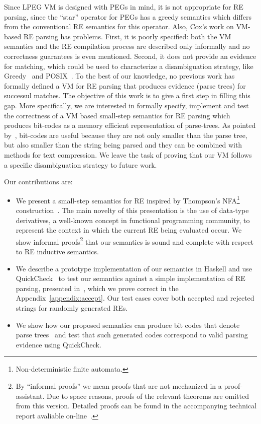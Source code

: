 \documentclass[sigplan]{acmart}
\theoremstyle{definition}
\begin{document}
Since LPEG VM is designed with PEGs in mind, it is not appropriate for RE parsing, since the ``star''
operator for PEGs has a greedy semantics which differs from the conventional RE semantics for this operator. Also, Cox's work
on VM-based RE parsing has problems. First, it is poorly specified: both the VM semantics and the RE
compilation process are described only informally and no correctness guarantees is even mentioned. Second,
it does not provide an evidence for matching, which could be used to characterize a disambiguation strategy, like
Greedy~\cite{Frisch2004} and POSIX~\cite{Sulzmann14}. To the best of our knowledge, no previous work
has formally defined a VM for RE parsing that produces evidence (parse trees) for successul matches.
The objective of this work is to give a first step in filling this gap. More specifically, we are interested in formally
specify, implement and test the correctness of a VM based small-step semantics for RE parsing which produces bit-codes as
a memory efficient representation of parse-trees. As pointed by~\cite{Lasse2011}, bit-codes are useful because they
are not only smaller than the parse tree, but also smaller than the string being parsed and they can be combined with methods
for text compression. We leave the task of proving that our VM follows a specific disambiguation
strategy to future work.

Our contributions are:

\begin{itemize}
	\item We present a small-step semantics for RE inspired by  Thompson's NFA\footnote{Non-deterministic finite automata.}
	construction~\cite{Thompson1968}. The main novelty of this presentation is
	the use of data-type derivatives, a well-known concept in functional programming community, to represent
	the context in which the current RE being evaluated occur. We show informal proofs\footnote{By ``informal proofs'' we
		mean proofs that are not mechanized in a proof-assistant. Due to space reasons, proofs of the relevant theorems are omitted from this
		version. Detailed proofs can be found in the accompanying technical report avaliable on-line~\cite{regexvm-rep}.} that our semantics
	is sound and complete with respect to RE inductive semantics.
	\item We describe a prototype implementation of our semantics in Haskell and use QuickCheck~\cite{Claessen2000} to test our semantics
	against a simple implementation of RE parsing, presented in~\cite{Fischer2010}, which we prove correct in the Appendix~\ref{appendix:accept}.
	Our test cases cover both accepted and rejected strings for randomly generated REs.
	\item We show how our proposed semantics can produce bit codes that denote parse trees~\cite{Lasse2011} and test that
	such generated codes correspond to valid parsing evidence using QuickCheck.
\end{itemize}
\end{document}
